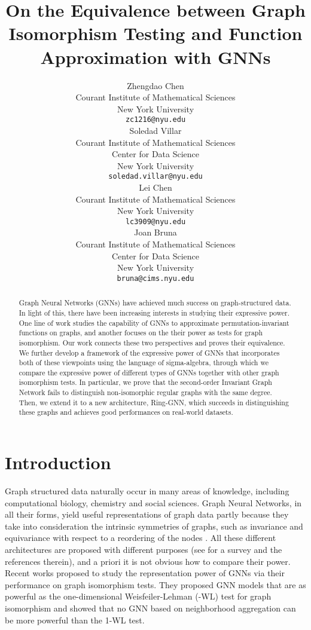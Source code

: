 \documentclass{article}
\title{On the Equivalence between Graph Isomorphism Testing and Function Approximation with GNNs}
\author{Zhengdao Chen \\
  Courant Institute of Mathematical Sciences\\
  New York University\\
  \texttt{zc1216@nyu.edu} \\
\And
     Soledad Villar \\
  Courant Institute of Mathematical Sciences\\
  Center for Data Science \\
  New York University\\
  \texttt{soledad.villar@nyu.edu} \\ 
   \AND
     Lei Chen \\
  Courant Institute of Mathematical Sciences\\
  New York University\\
  \texttt{lc3909@nyu.edu} \\
   \And
    Joan Bruna \\
  Courant Institute of Mathematical Sciences\\
  Center for Data Science \\
  New York University\\
  \texttt{bruna@cims.nyu.edu} \\ 
}
\begin{document}
\maketitle


\begin{abstract}
Graph Neural Networks (GNNs) have achieved much success on graph-structured data. In light of this, there have been increasing interests in studying their expressive power. One line of work studies the capability of GNNs to approximate permutation-invariant functions on graphs, and another focuses on the their power as tests for graph isomorphism. Our work connects these two perspectives and proves their equivalence. We further develop a framework of the expressive power of GNNs that incorporates both of these viewpoints using the language of sigma-algebra, through which we compare the expressive power of different types of GNNs together with other graph isomorphism tests. In particular, we prove that the second-order Invariant Graph Network fails to distinguish non-isomorphic regular graphs with the same degree. Then, we extend it to a new architecture, Ring-GNN, which succeeds in distinguishing these graphs and achieves good performances on real-world datasets.
\end{abstract}


\section{Introduction}
Graph structured data naturally occur in many areas of knowledge, including computational biology, chemistry and social sciences. Graph Neural Networks, in all their forms, yield useful representations of graph data partly because they take into consideration the intrinsic symmetries of graphs, such as invariance and equivariance with respect to a reordering of the nodes \cite{scarselli2008graph, duvenaud2015convolutional, kipf2016semi, gilmer2017neural, hamilton2017inductive, velickovic2017graph, bronstein2017geometric, you2019pgnn}.
All these different architectures are proposed with different purposes (see \cite{wu2019comprehensive} for a survey and the references therein), and a priori it is not obvious how to compare their power. Recent works \cite{xu2018powerful, morris2019higher} proposed to study the representation power of GNNs via their performance on graph isomorphism tests. They proposed GNN models that are as powerful as the one-dimensional Weisfeiler-Lehman (-WL) test for graph isomorphism \cite{weisfeiler1968reduction} and showed that no GNN based on neighborhood aggregation can be more powerful than the 1-WL test. 
\end{document}
